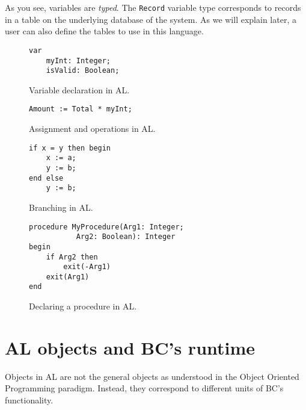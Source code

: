 As you see, variables are \emph{typed}. The \texttt{Record} variable type corresponds to
records in a table on the underlying database of the system. As we will explain later,
a user can also define the tables to use in this language.

\begin{figure}
    \begin{minipage}{.45\textwidth}
        \begin{Verbatim}[fontsize=\tiny]
var
    myInt: Integer;
    isValid: Boolean;
        \end{Verbatim}
        \parbox{0.9\textwidth}{\caption{Variable declaration in AL.}}
        \label{fig:al-var-decl}
    \end{minipage}%
    \begin{minipage}{.45\textwidth}
        \begin{Verbatim}[fontsize=\tiny]
Amount := Total * myInt;
        \end{Verbatim}
        \caption{Assignment and operations in AL.}
    \end{minipage}
\end{figure}

\begin{figure}
    \begin{minipage}{.45\textwidth}
        \begin{Verbatim}[fontsize=\tiny]
if x = y then begin  
    x := a;  
    y := b;  
end else 
    y := b;   
        \end{Verbatim}
        \parbox{0.9\textwidth}{\caption{Branching in AL.}}
    \end{minipage}%
    \begin{minipage}{.45\textwidth}
        \begin{Verbatim}[fontsize=\tiny]
procedure MyProcedure(Arg1: Integer; 
           Arg2: Boolean): Integer
begin
    if Arg2 then
        exit(-Arg1)
    exit(Arg1)
end
        \end{Verbatim}
        \parbox{0.9\textwidth}{\caption{Declaring a procedure in AL.}}
        \label{fig:al-proc-decl}
    \end{minipage}%

\end{figure}

\section{AL objects and BC's runtime}
Objects in AL are not the general objects as understood in the Object Oriented Programming paradigm. Instead,
they correspond to different units of BC's functionality.

